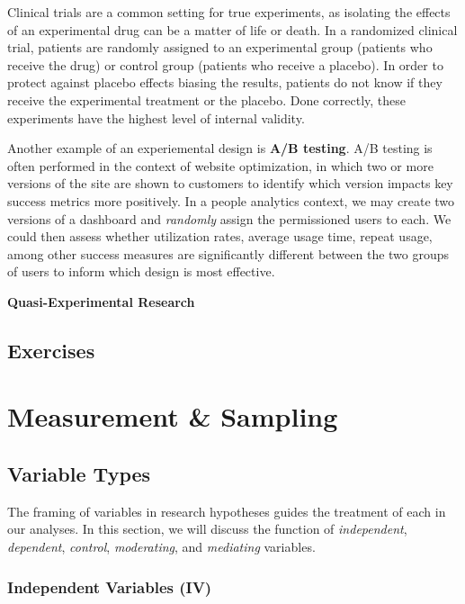 \documentclass[]{book}
\begin{document}
Clinical trials are a common setting for true experiments, as isolating the effects of an experimental drug can be a matter of life or death. In a randomized clinical trial, patients are randomly assigned to an experimental group (patients who receive the drug) or control group (patients who receive a placebo). In order to protect against placebo effects biasing the results, patients do not know if they receive the experimental treatment or the placebo. Done correctly, these experiments have the highest level of internal validity.

Another example of an experiemental design is \textbf{A/B testing}. A/B testing is often performed in the context of website optimization, in which two or more versions of the site are shown to customers to identify which version impacts key success metrics more positively. In a people analytics context, we may create two versions of a dashboard and \emph{randomly} assign the permissioned users to each. We could then assess whether utilization rates, average usage time, repeat usage, among other success measures are significantly different between the two groups of users to inform which design is most effective.

\textbf{Quasi-Experimental Research}

\hypertarget{exercises}{%
\section{Exercises}\label{exercises}}

\hypertarget{measure-sampl}{%
\chapter{Measurement \& Sampling}\label{measure-sampl}}

\hypertarget{variable-types}{%
\section{Variable Types}\label{variable-types}}

The framing of variables in research hypotheses guides the treatment of each in our analyses. In this section, we will discuss the function of \emph{independent}, \emph{dependent}, \emph{control}, \emph{moderating}, and \emph{mediating} variables.

\hypertarget{independent-variables-iv}{%
\subsection{Independent Variables (IV)}\label{independent-variables-iv}}
\end{document}
